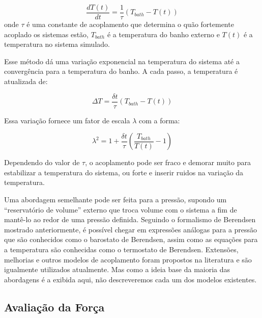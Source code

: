 \begin{equation}
\frac{dT(t)}{dt} = \frac{1}{\tau}\left( T_{bath}-T(t) \right)
\end{equation}
onde $\tau$ é uma constante de acoplamento que determina o quão fortemente acoplado os sistemas estão, $T_{bath}$ é a temperatura do banho externo e $T(t)$ é a temperatura no sistema simulado.

Esse método dá uma variação exponencial na temperatura do sistema até a convergência para a temperatura do banho.
A cada passo, a temperatura é atualizada de:

\begin{equation}
\Delta T = \frac{\delta t}{\tau}\left( T_{bath}-T(t) \right)
\end{equation}

Essa variação fornece um fator de escala $\lambda$ com a forma:

\begin{equation}
\lambda ^2 = 1 + \frac{\delta t}{\tau}\left( \frac{T_{bath}}{T(t)} - 1 \right)
\end{equation}

Dependendo do valor de $\tau$, o acoplamento pode ser fraco e demorar muito para estabilizar a temperatura do sistema, ou forte e inserir ruidos na variação da temperatura.

Uma abordagem semelhante pode ser feita para a pressão, supondo um ``reservatório de volume'' externo que troca volume com o sistema a fim de mantê-lo ao redor de uma pressão definida.
Seguindo o formalismo de Berendsen mostrado anteriormente, é possível chegar em expressões análogas para a pressão que são conhecidos como o barostato de Berendsen, assim como as equações para a temperatura são conhecidas como o termostato de Berendsen.
Extensões, melhorias e outros modelos de acoplamento foram propostos na literatura e são igualmente utilizados atualmente.
Mas como a ideia base da maioria das abordagens é a exibida aqui, não descreveremos cada um dos modelos existentes\cite{Leach2001}.

\subsection{Avaliação da Força}

